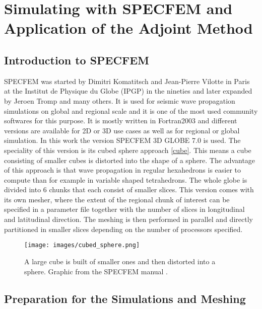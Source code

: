 \section{Simulating with SPECFEM and Application of the Adjoint Method}

\subsection{Introduction to SPECFEM}

SPECFEM was started by Dimitri Komatitsch and Jean-Pierre Vilotte in Paris at the 
Institut de Physique du Globe (IPGP) \citep{Vilotte1998} in the nineties and later expanded by Jeroen Tromp and many others. 
It is used for seismic wave propagation simulations on global and regional scale and it is one of the 
most used community softwares for this purpose. 
It is mostly written in Fortran2003 and different versions are available for 2D or 3D use cases as well
as for regional or global simulation. 
In this work the version SPECFEM 3D GLOBE 7.0 is used.
The speciality of this version is its cubed sphere approach \autoref{cube}.
This means a cube consisting of smaller cubes is distorted into the shape of a sphere.
The advantage of this approach is that wave propagation in regular hexahedrons is easier to compute than
for example in variable shaped tetrahedrons. %
The whole globe is divided into 6 chunks that each consist of smaller slices.
This version comes with its own mesher, where the extent of the regional chunk of interest can be 
specified in a parameter file together with the number of slices in longitudinal and latitudinal direction.
The meshing is then performed in parallel and directly partitioned in smaller slices depending on the
number of processors specified.



\begin{figure}[h]
\begin{center}
\texttt{[image: images/cubed\_sphere.png]}
\caption{A large cube is built of smaller ones and then distorted into a sphere.
Graphic from the SPECFEM manual \citep{specfem_manual}.}
\label{cube}
\end{center}
\end{figure}


\subsection{Preparation for the Simulations and Meshing}

